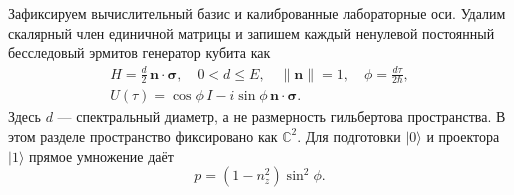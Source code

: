 \section{}\label{sec:fibre}
{Зафиксируем вычислительный базис и калиброванные лабораторные оси. Удалим скалярный член единичной матрицы и запишем каждый ненулевой постоянный бесследовый эрмитов генератор кубита как}
\begin{equation}\label{eq:qubit}
 \begin{gathered}
 H=\frac d2\,\mathbf n\cdot\boldsymbol\sigma,\quad
 0<d\leq E,\quad\|\mathbf n\|=1,\quad\phi=\frac{d\tau}{2\hbar},\\
 U(\tau)=\cos\phi\,I-i\sin\phi\,\mathbf n\cdot\boldsymbol\sigma.
 \end{gathered}
\end{equation}
{Здесь $d$ --- спектральный диаметр, а не размерность гильбертова пространства. В этом разделе пространство фиксировано как $\mathbb C^2$. Для подготовки $|0\rangle$ и проектора $|1\rangle$ прямое умножение даёт}
\begin{equation}\label{eq:qubitresponse}
 p=(1-n_z^2)\sin^2\phi.
\end{equation}

